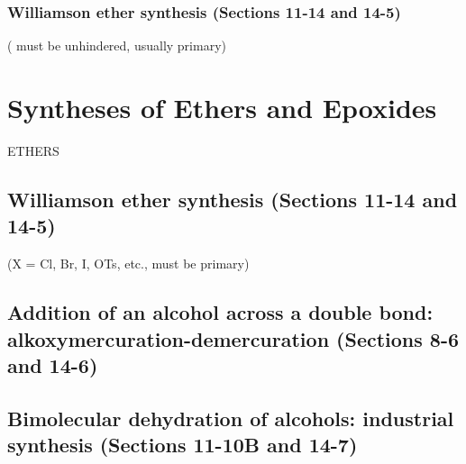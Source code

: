 

\subsubsection{Williamson ether synthesis \normalfont(Sections 11-14 and 14-5)}

( must be unhindered, usually primary)



\section{Syntheses of Ethers and Epoxides}
{\large ETHERS}


\subsection{Williamson ether synthesis \normalfont(Sections 11-14 and 14-5)}

(X = Cl, Br, I, OTs, etc.,  must be primary)


\subsection{Addition of an alcohol across a double bond: alkoxymercuration-demercuration \normalfont(Sections 8-6 and 14-6)}



\subsection{Bimolecular dehydration of alcohols: industrial synthesis \normalfont(Sections 11-10B and 14-7)}

